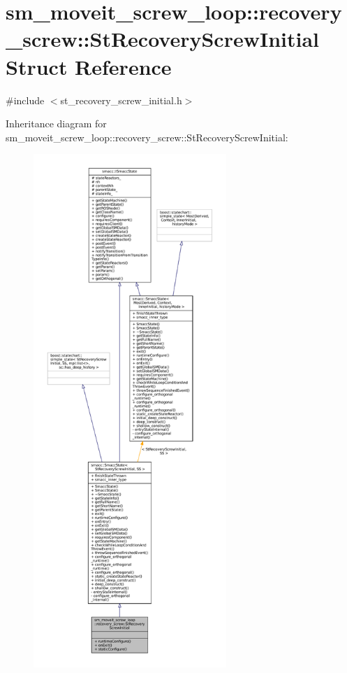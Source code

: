\hypertarget{structsm__moveit__screw__loop_1_1recovery__screw_1_1StRecoveryScrewInitial}{}\section{sm\+\_\+moveit\+\_\+screw\+\_\+loop\+:\+:recovery\+\_\+screw\+:\+:St\+Recovery\+Screw\+Initial Struct Reference}
\label{structsm__moveit__screw__loop_1_1recovery__screw_1_1StRecoveryScrewInitial}


{\ttfamily \#include $<$st\+\_\+recovery\+\_\+screw\+\_\+initial.\+h$>$}



Inheritance diagram for sm\+\_\+moveit\+\_\+screw\+\_\+loop\+:\+:recovery\+\_\+screw\+:\+:St\+Recovery\+Screw\+Initial\+:
\nopagebreak
\begin{figure}[H]
\begin{center}
\leavevmode
\includegraphics[height=550pt]{structsm__moveit__screw__loop_1_1recovery__screw_1_1StRecoveryScrewInitial__inherit__graph}
\end{center}
\end{figure}


